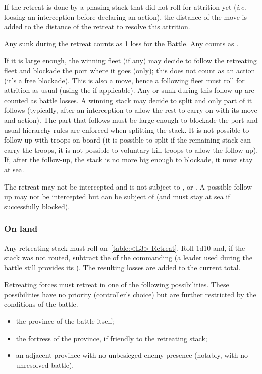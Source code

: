 If the retreat is done by a phasing stack that did not roll for attrition yet
(\emph{i.e.} loosing an interception before declaring an action), the distance
of the move is added to the distance of the retreat to resolve this
attrition.

Any \ND sunk during the retreat counts as 1 loss for the Battle. Any \NDE
counts as \texttu.

If it is large enough, the winning fleet (if any) may decide to follow the
retreating fleet and blockade the port where it goes (only); this does not
count as an action (it's a free blockade). This is also a move, hence a
following fleet must roll for attrition as usual (using the
 \LeaderA if applicable). Any \ND or \NDE sunk during this
follow-up are counted as battle losses. A winning stack may decide to split
and only part of it follows (typically, after an interception to allow the
rest to carry on with its move and action). The part that follows must be
large enough to blockade the port and usual hierarchy rules are enforced when
splitting the stack. It is not possible to follow-up with troops on board (it
is possible to split if the remaining stack can carry the troops, it is not
possible to voluntary kill troops to allow the follow-up). If, after the
follow-up, the stack is no more big enough to blockade, it must stay at sea.

The retreat may not be intercepted and is not subject to \Presidios,
\StraitFort or \USURE. A possible follow-up may not be intercepted but can be
subject of \StraitFort (and must stay at sea if successfully blocked).

\subsubsection{On land}

Any retreating stack must roll on~\ref{table:<L3> Retreat}. Roll 1d10 and, if
the stack was not routed, subtract the \Man of the commanding \LeaderG (a
 leader used during the battle still provides its
\Man). The resulting losses are added to the current total.

Retreating forces must retreat in one of the following possibilities. These
possibilities have no priority (controller's choice) but are further
restricted by the conditions of the battle.
\begin{itemize}
\item the province of the battle itself;
\item the fortress of the province, if friendly to the retreating stack;
\item an adjacent province with no unbesieged enemy presence (notably, with no
  unresolved battle).
\end{itemize}


